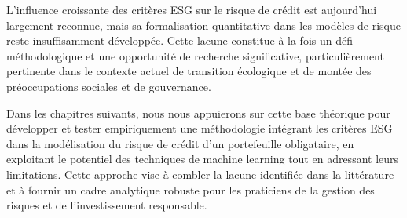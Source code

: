 L'influence croissante des critères ESG sur le risque de crédit est aujourd'hui largement reconnue, mais sa formalisation quantitative dans les modèles de risque reste insuffisamment développée. Cette lacune constitue à la fois un défi méthodologique et une opportunité de recherche significative, particulièrement pertinente dans le contexte actuel de transition écologique et de montée des préoccupations sociales et de gouvernance.

Dans les chapitres suivants, nous nous appuierons sur cette base théorique pour développer et tester empiriquement une méthodologie intégrant les critères ESG dans la modélisation du risque de crédit d'un portefeuille obligataire, en exploitant le potentiel des techniques de machine learning tout en adressant leurs limitations. Cette approche vise à combler la lacune identifiée dans la littérature et à fournir un cadre analytique robuste pour les praticiens de la gestion des risques et de l'investissement responsable.